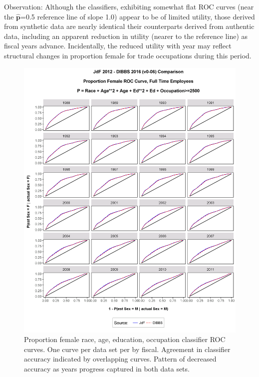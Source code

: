 \documentclass[10pt, letterpaper]{article}
\newcommand{\mest}[1]{\hat{\bm{#1}}}
\begin{document}
\begin{spacing}{1.0}
Observation:  Although the classifiers, exhibiting somewhat flat ROC curves (near the $\mest{p}$=0.5 reference line of slope 1.0) appear to be of limited utility, those derived from synthetic data are nearly identical their counterparts derived from authentic data, including an apparent reduction in utility (nearer to the reference line) as fiscal years advance.  Incidentally, the reduced utility with year may reflect structural changes in proportion female for trade occupations during this period.\\

\begin{figure}[h]
    \centering
    \includegraphics[width=5in, trim={0 0.75in 0 1in}, clip]{GenderProportionROCAgeAgeSqEdEdSqRaceOccGE2500ByFYv0-06.png}
    \caption{Proportion female race, age, education, occupation classifier ROC curves.  One curve per data set per by fiscal.  Agreement in classifier accuracy indicated by overlapping curves. Pattern of decreased accuracy as years progress captured in both data sets. }
    \label{figure:GenderProportionROCAgeAgeSqEdEdSqRaceOccGE2500ByFYv0-06}
\end{figure}


\end{spacing}
\end{document}
